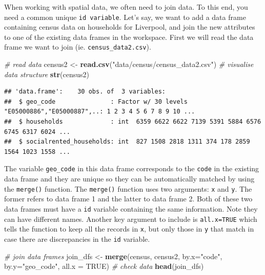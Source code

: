 \documentclass[]{book}
\newenvironment{Shaded}{\begin{snugshade}}{\end{snugshade}}
\newcommand{\KeywordTok}[1]{\textcolor[rgb]{0.13,0.29,0.53}{\textbf{#1}}}
\newcommand{\DataTypeTok}[1]{\textcolor[rgb]{0.13,0.29,0.53}{#1}}
\newcommand{\StringTok}[1]{\textcolor[rgb]{0.31,0.60,0.02}{#1}}
\newcommand{\CommentTok}[1]{\textcolor[rgb]{0.56,0.35,0.01}{\textit{#1}}}
\newcommand{\OtherTok}[1]{\textcolor[rgb]{0.56,0.35,0.01}{#1}}
\newcommand{\NormalTok}[1]{#1}
\begin{document}
When working with spatial data, we often need to join data. To this end,
you need a common unique \texttt{id\ variable}. Let's say, we want to
add a data frame containing census data on households for Liverpool, and
join the new attributes to one of the existing data frames in the
workspace. First we will read the data frame we want to join (ie.
\texttt{census\_data2.csv}).

\begin{Shaded}
\begin{Highlighting}[]
\CommentTok{# read data}
\NormalTok{census2 <-}\StringTok{ }\KeywordTok{read.csv}\NormalTok{(}\StringTok{"data/census/census_data2.csv"}\NormalTok{)}
\CommentTok{# visualise data structure}
\KeywordTok{str}\NormalTok{(census2)}
\end{Highlighting}
\end{Shaded}

\begin{verbatim}
## 'data.frame':    30 obs. of  3 variables:
##  $ geo_code               : Factor w/ 30 levels "E05000886","E05000887",..: 1 2 3 4 5 6 7 8 9 10 ...
##  $ households             : int  6359 6622 6622 7139 5391 5884 6576 6745 6317 6024 ...
##  $ socialrented_households: int  827 1508 2818 1311 374 178 2859 1564 1023 1558 ...
\end{verbatim}

The variable \texttt{geo\_code} in this data frame corresponds to the
\texttt{code} in the existing data frame and they are unique so they can
be automatically matched by using the \texttt{merge()} function. The
\texttt{merge()} function uses two arguments: \texttt{x} and \texttt{y}.
The former refers to data frame 1 and the latter to data frame 2. Both
of these two data frames must have a \texttt{id} variable containing the
same information. Note they can have different names. Another key
argument to include is \texttt{all.x=TRUE} which tells the function to
keep all the records in \texttt{x}, but only those in \texttt{y} that
match in case there are discrepancies in the \texttt{id} variable.

\begin{Shaded}
\begin{Highlighting}[]
\CommentTok{# join data frames}
\NormalTok{join_dfs <-}\StringTok{ }\KeywordTok{merge}\NormalTok{(census, census2, }\DataTypeTok{by.x=}\StringTok{"code"}\NormalTok{, }\DataTypeTok{by.y=}\StringTok{"geo_code"}\NormalTok{, }\DataTypeTok{all.x =} \OtherTok{TRUE}\NormalTok{)}
\CommentTok{# check data}
\KeywordTok{head}\NormalTok{(join_dfs)}
\end{Highlighting}
\end{Shaded}
\end{document}
